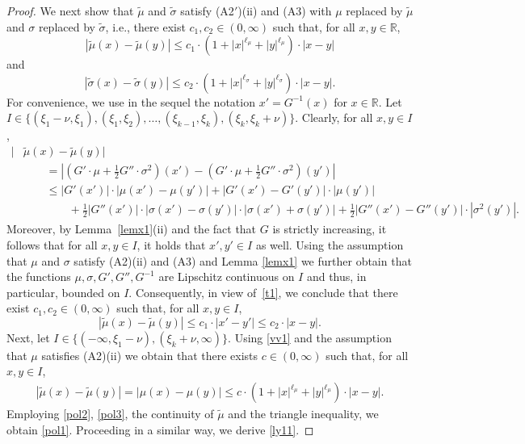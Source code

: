 \documentclass[11pt]{amsart}
\newcommand{\R}{{\mathbb R}}
\theoremstyle{plain}
\theoremstyle{definition}
\begin{document}
\begin{proof}
We next show that $\widetilde \mu$ and  $\widetilde \sigma$ satisfy  (A2$'$)(ii) and (A3) with $\mu$ replaced by $
\widetilde \mu$ and $\sigma$ replaced by $\widetilde \sigma$, i.e.,  there exist $c_1, c_2\in (0, \infty)$ such that, for all $x,y\in \R$,
\begin{equation}\label{pol1}
|\widetilde\mu(x)-\widetilde\mu(y)|\leq c_1\cdot (1+|x|^{\ell_\mu}+|y|^{\ell_\mu})\cdot |x-y|
\end{equation}
and
 \begin{equation}\label{ly11}
|\widetilde\sigma(x)-\widetilde\sigma(y)|\leq c_2\cdot (1+|x|^{\ell_{\sigma}}+|y|^{\ell_{\sigma}})\cdot |x-y|.
\end{equation}
For  convenience, we use in the sequel the notation $x'=G^{-1}(x)$ for $x\in\R$.  Let $I\in\{(\xi_1-\nu, \xi_1), (\xi_1, \xi_2), \ldots, (\xi_{k-1}, \xi_k), (\xi_k, \xi_k+\nu)\}$. Clearly, for all $x,y\in I$,
\begin{equation}\label{t1}
\begin{aligned}
|& \widetilde\mu(x)-\widetilde\mu(y)|\\
&\qquad =|(G'\cdot \mu+\tfrac{1}{2}G''\cdot\sigma^2)(x')-(G'\cdot \mu+\tfrac{1}{2}G''\cdot\sigma^2)(y')|\\
&\qquad \leq |G'(x')| \cdot |\mu(x')-\mu(y')|+|G'(x')-G'(y')|\cdot |\mu(y')|\\
&\qquad\qquad+\tfrac{1}{2}|G''(x')| \cdot |\sigma(x')-\sigma(y')|\cdot |\sigma(x')+\sigma(y')| +\tfrac{1}{2}|G''(x')-G''(y')|\cdot |\sigma^2(y')|.
\end{aligned}
\end{equation}
Moreover, by Lemma~\ref{lemx1}(ii) and the fact that $G$ is strictly increasing, it follows that for all $x,y\in I$, it holds that $x', y'\in I$ as well. Using the assumption that
$\mu$ and $\sigma$ satisfy (A2)(ii) and (A3)
and Lemma \ref{lemx1} we further obtain that the functions $\mu, \sigma, G', G'', G^{-1}$ are  Lipschitz continuous on $I$ and thus, in particular,  bounded on $I$. Consequently, in view of~\eqref{t1}, we conclude  that there exist $c_1, c_2\in (0, \infty)$ such that, for all $x,y\in I$,
\begin{equation}\label{pol2}
|\widetilde\mu(x)-\widetilde\mu(y)|\leq c_1\cdot |x'-y'|\leq c_2\cdot |x-y|.
\end{equation}
Next, let $I\in\{(-\infty, \xi_1-\nu), (\xi_k+\nu, \infty)\}$.
Using \eqref{vv1} and the assumption that
$\mu$  satisfies (A2)(ii) we obtain that there exists $c\in (0, \infty)$ such that, for all $x,y\in I$,
\begin{equation}\label{pol3}
\begin{aligned}
|\widetilde\mu(x)-\widetilde\mu(y)|
=|\mu(x)-\mu(y)|\leq c\cdot (1+|x|^{\ell_\mu}+|y|^{\ell_\mu})\cdot |x-y|.
\end{aligned}
\end{equation}
Employing \eqref{pol2}, \eqref{pol3}, the continuity of $\widetilde\mu$  and the triangle inequality, we obtain \eqref{pol1}.
Proceeding in a similar way, we derive \eqref{ly11}.


\end{proof}
\end{document}
